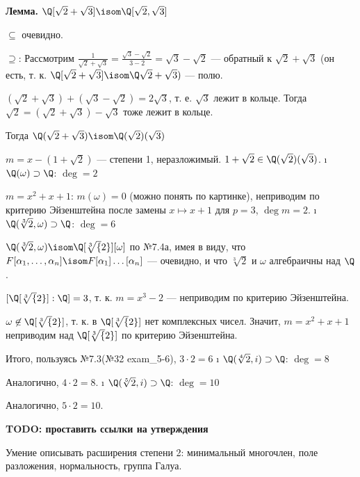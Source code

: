 \begin{solution}
\begin{itemize}
  \bf{Лемма.} $\Q[\sqrt2+\sqrt3] \isom \Q[\sqrt2, \sqrt3]$
  \begin{solution}
	$\subseteq$ очевидно.
	
	$\supseteq$: Рассмотрим $\frac{1}{\sqrt2+\sqrt3} = \frac{\sqrt3-\sqrt2}{3-2} = \sqrt3-\sqrt2$ --- обратный к $\sqrt2+\sqrt3$ (он есть, т. к. $\Q[\sqrt2+\sqrt3] \isom \Q\sqrt2+\sqrt3)$ --- полю.
	
	$(\sqrt2+\sqrt3)+(\sqrt3-\sqrt2) = 2\sqrt3$, т. е. $\sqrt3$ лежит в кольце. Тогда $\sqrt2 = (\sqrt2+\sqrt3)-\sqrt3$ тоже лежит в кольце.
  \end{solution}
  
  Тогда $\Q(\sqrt2+\sqrt{3}) \isom \Q(\sqrt2)(\sqrt{3})$
  
  $m = x-(1+\sqrt2)$ --- степени 1, неразложимый. $1+\sqrt2 \in \Q(\sqrt2)(\sqrt{3})$.
\i
  \(\Q(\omega) \supset \Q\): \(\deg = 2\)
  
  $m = x^2+x+1$: $m(\omega) = 0$ (можно понять по картинке), неприводим по критерию Эйзенштейна после замены $x \mapsto x+1$ для $p=3$, $\deg m = 2$.
\i
  \(\Q(\sqrt[3]{2}, \omega) \supset \Q\): \(\deg = 6\)
  
  $\Q(\sqrt[3]{2}, \omega) \isom \Q[\sqrt[3]{2}][\omega]$ по №7.4а, имея в виду, что $F[\alpha_1, \dots, \alpha_n] \isom F[\alpha_1]\dots[\alpha_n]$ --- очевидно, и что $\sqrt[3]{2}$ и $\omega$ алгебраичны над $\Q$.
  
  $[\Q[\sqrt[3]{2}]:\Q] = 3$, т. к. $m = x^3-2$ --- неприводим по критерию Эйзенштейна.
  
  $\omega \not\in \Q[\sqrt[3]{2}]$, т. к. в $\Q[\sqrt[3]{2}]$ нет комплексных чисел. Значит, $m = x^2+x+1$ неприводим над $\Q[\sqrt[3]{2}]$ по критерию Эйзенштейна.
  
  Итого, пользуясь №7.3(№32 exam\_5-6), $3\cdot 2 = 6$
\i
  \(\Q(\sqrt[4]{2}, i) \supset \Q\): \(\deg = 8\)
  
  Аналогично, $4\cdot2 = 8$.
\i
  \(\Q(\sqrt[5]{2}, i) \supset \Q\): \(\deg = 10\)
  
  Аналогично, $5\cdot2 = 10$.
\end{itemize}

\bf{TODO: проставить ссылки на утверждения}
\end{solution}

\begin{problem}[35(6.10,8.9а,10.5)] Умение описывать расширения степени 2: минимальный многочлен, поле разложения, нормальность, группа Галуа.
\end{problem}

